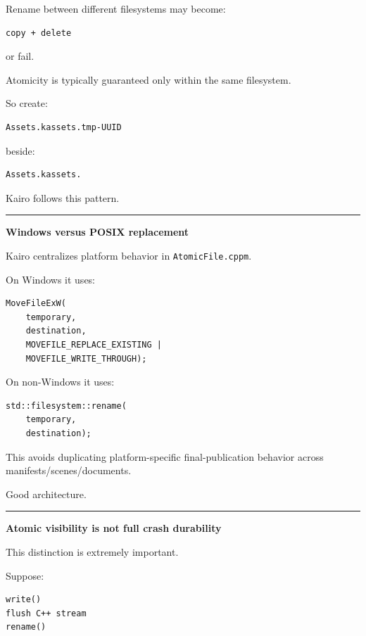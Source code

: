 Rename between different filesystems may become:

\begin{verbatim}
copy + delete
\end{verbatim}

or fail.

Atomicity is typically guaranteed only within the same filesystem.

So create:

\begin{verbatim}
Assets.kassets.tmp-UUID
\end{verbatim}

beside:

\begin{verbatim}
Assets.kassets.
\end{verbatim}

Kairo follows this pattern.

\begin{center}\rule{0.5\linewidth}{0.5pt}\end{center}

\textbf{Windows versus POSIX replacement}

Kairo centralizes platform behavior in \texttt{AtomicFile.cppm}.

On Windows it uses:

\begin{verbatim}
MoveFileExW(
    temporary,
    destination,
    MOVEFILE_REPLACE_EXISTING |
    MOVEFILE_WRITE_THROUGH);
\end{verbatim}

On non-Windows it uses:

\begin{verbatim}
std::filesystem::rename(
    temporary,
    destination);
\end{verbatim}

This avoids duplicating platform-specific final-publication behavior across manifests/scenes/documents.

Good architecture.

\begin{center}\rule{0.5\linewidth}{0.5pt}\end{center}

\textbf{Atomic visibility is not full crash durability}

This distinction is extremely important.

Suppose:

\begin{verbatim}
write()
flush C++ stream
rename()
\end{verbatim}

